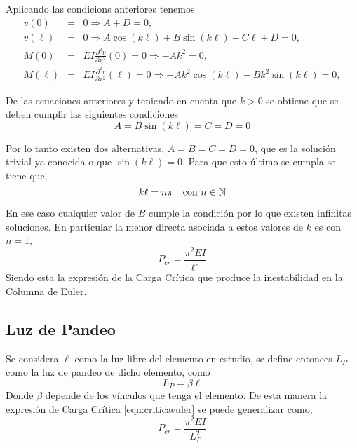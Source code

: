 Aplicando las condicions anteriores tenemos
\begin{eqnarray}
v(0) &=& 0 \Rightarrow A + D = 0, \\
v(\ell) &=& 0 \Rightarrow A \cos(k \ell) + B \sin(k \ell) + C \ell + D = 0, \\
M(0) &=& EI \frac {\partial^2 v}{\partial x^2} (0) = 0 \Rightarrow -Ak^2 = 0,  \\
M(\ell) &=& EI \frac{\partial^2 v}{\partial x^2} (\ell) = 0  \Rightarrow -Ak^2\cos(k \ell) -  B k^2 \sin(k\ell) = 0,
\end{eqnarray}

De las ecuaciones anteriores y teniendo en cuenta que $k>0$ se obtiene que se deben cumplir las siguientes condiciones
\begin{equation}
A = B\sin(k\ell) = C = D = 0
\end{equation}

Por lo tanto existen dos alternativas, $A = B = C = D = 0$, que es la solución trivial ya conocida o que $\sin(k\ell) = 0$.
Para que esto último se cumpla se tiene que,
\begin{equation}
k \ell = n \pi  \quad \text{con} \,\, n\in {\mathbb N}
\end{equation}

En ese caso cualquier valor de $B$ cumple la condición por lo que existen infinitas soluciones. En particular la menor directa asociada a estos valores de $k$ es con $n=1$,
\begin{equation}\label{eqn:criticaeuler}
\boxed{P_{cr} = \frac{\pi^2 E I}{\ell^2}}
\end{equation}
Siendo esta la expresión de la Carga Crítica que produce la inestabilidad en la Columna de Euler.

\subsection{Luz de Pandeo}

Se considera $\ell$ como la luz libre del elemento en estudio, se define entonces $L_P$ como la luz de pandeo de dicho elemento, como
\begin{equation}
L_P=\beta\ell
\end{equation}
Donde $\beta$ depende de los vínculos que tenga el elemento. De esta manera la expresión de Carga Crítica \eqref{eqn:criticaeuler} se puede generalizar como,
\begin{equation}\label{eqn:criticageneral}
\boxed{P_{cr} = \frac{\pi^2 E I}{L_P^2}}
\end{equation}

